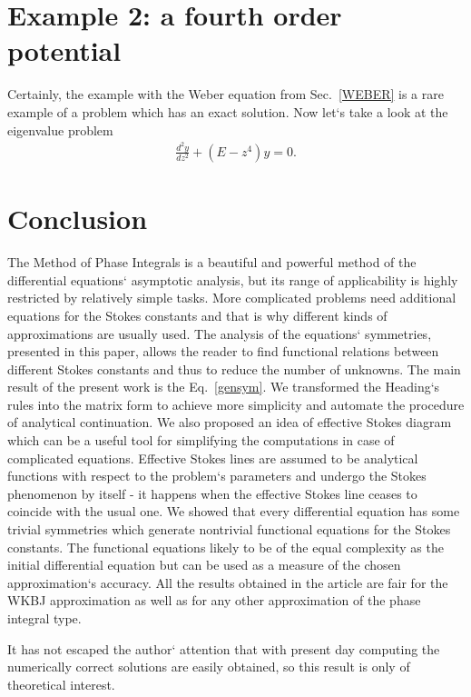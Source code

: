 \documentclass[aps,prl,preprint,superscriptaddress]{revtex4}
\begin{document}
\section{Example 2: a fourth order potential \label{4ORDR}}
Certainly, the example with the Weber equation from Sec.~\ref{WEBER} is a rare example of a problem which has an exact solution. 
Now let`s take a look at the eigenvalue problem
\begin{eqnarray}
\frac{d^2y}{dz^2}+(E-z^4)y=0.
\label{4ordr}  
\end{eqnarray}

\section{Conclusion \label{CNCLSNS}}

The Method of Phase Integrals is a beautiful and powerful method of the differential equations` asymptotic analysis, but its range of applicability is highly restricted by relatively simple tasks. More complicated problems need additional equations for the Stokes constants and that is why different kinds of approximations \cite{white,ours} are usually used. The analysis of the equations` symmetries, presented in this paper, allows the reader to find functional relations between different Stokes constants and thus to reduce the number of unknowns. The main result of the present work is the Eq.~\ref{gensym}. We transformed the Heading`s rules \cite{heading,white} into the matrix form to achieve more simplicity and automate the procedure of analytical continuation. We also proposed an idea of effective Stokes diagram which can be a useful tool for simplifying the computations in case of complicated equations. Effective Stokes lines are assumed to be analytical functions with respect to the problem`s parameters and undergo the Stokes phenomenon by itself - it happens when the effective Stokes line ceases to coincide with the usual one. We showed that every differential equation has some trivial symmetries which generate nontrivial functional equations for the Stokes constants. The functional equations likely to be of the equal complexity as the initial differential equation but can be used as a measure of the chosen approximation`s accuracy. All the results obtained in the article are fair for the WKBJ approximation as well as for any other approximation of the phase integral type.

It has not escaped the author` attention that with present day computing the numerically correct solutions are easily obtained, so this result is only of theoretical interest.
\end{document}
